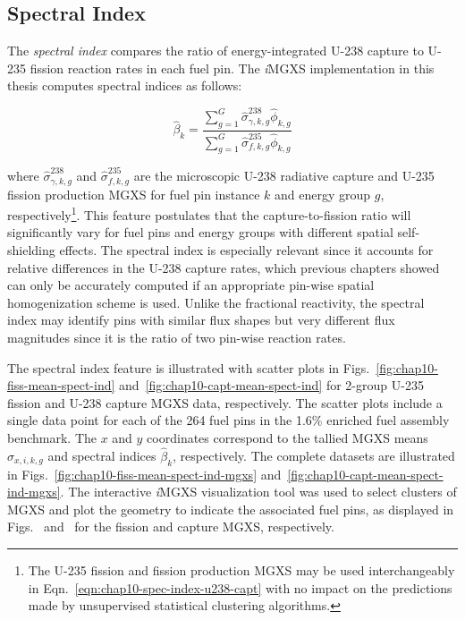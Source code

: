 \clearpage

\subsection{Spectral Index}
\label{subsec:chap10-spec-index}

The \textit{spectral index} compares the ratio of energy-integrated U-238 capture to U-235 fission reaction rates in each fuel pin. The \textit{i}\ac{MGXS} implementation in this thesis computes spectral indices as follows:

\begin{equation}
\label{eqn:chap10-spec-index-u238-capt}
\hat{\beta}_{k} = \frac{\displaystyle\sum\limits_{g=1}^{G}\hat{\sigma}_{\gamma,k,g}^{238}\hat{\phi}_{k,g}}{\displaystyle\sum\limits_{g=1}^{G}\hat{\sigma}_{f,k,g}^{235}\hat{\phi}_{k,g}}
\end{equation}

\noindent where $\hat{\sigma}_{\gamma,k,g}^{238}$ and $\hat{\sigma}_{f,k,g}^{235}$ are the microscopic U-238 radiative capture and U-235 fission production \ac{MGXS} for fuel pin instance $k$ and energy group $g$, respectively\footnote{The U-235 fission and fission production \ac{MGXS} may be used interchangeably in Eqn.~\ref{eqn:chap10-spec-index-u238-capt} with no impact on the predictions made by unsupervised statistical clustering algorithms.}. This feature postulates that the capture-to-fission ratio will significantly vary for fuel pins and energy groups with different spatial self-shielding effects. The spectral index is especially relevant since it accounts for relative differences in the U-238 capture rates, which previous chapters showed can only be accurately computed if an appropriate pin-wise spatial homogenization scheme is used. Unlike the fractional reactivity, the spectral index may identify pins with similar flux shapes but very different flux magnitudes since it is the ratio of two pin-wise reaction rates.

The spectral index feature is illustrated with scatter plots in Figs.~\ref{fig:chap10-fiss-mean-spect-ind} and~\ref{fig:chap10-capt-mean-spect-ind} for 2-group U-235 fission and U-238 capture \ac{MGXS} data, respectively. The scatter plots include a single data point for each of the 264 fuel pins in the 1.6\% enriched fuel assembly benchmark. The $x$ and $y$ coordinates correspond to the tallied \ac{MGXS} means $\hat{\sigma}_{x,i,k,g}$ and spectral indices $\hat{\beta}_{k}$, respectively. The complete datasets are illustrated in Figs.~\ref{fig:chap10-fiss-mean-spect-ind-mgxs} and~\ref{fig:chap10-capt-mean-spect-ind-mgxs}. The interactive \textit{i}\ac{MGXS} visualization tool was used to select clusters of \ac{MGXS} and plot the geometry to indicate the associated fuel pins, as displayed in Figs.~ and~ for the fission and capture \ac{MGXS}, respectively. 

